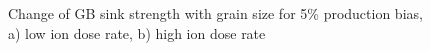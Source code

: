 \documentclass[a4paper]{article}
\begin{document}
\begin{figure}[h!]
        \caption{Change of GB sink strength with grain size for 5\% production bias, a) low ion dose rate, b) high ion dose rate}
        \label{figure:sink_strengths_ion_5_1e-6}
      \end{figure}
\end{document}
